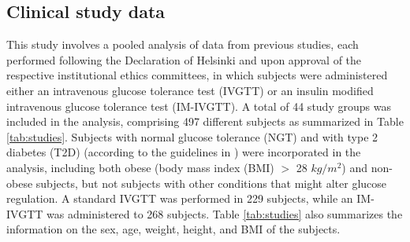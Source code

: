 \documentclass[utf8]{frontiersSCNS} %
\begin{document}
\subsection{Clinical study data}
This study involves a pooled analysis of data from previous studies, each performed following the Declaration of Helsinki and upon approval of the respective institutional ethics committees, in which subjects were administered either an intravenous glucose tolerance test (IVGTT) or an insulin modified intravenous glucose tolerance test (IM-IVGTT). A total of 44 study groups was included in the analysis, comprising 497 different subjects as summarized in Table \ref{tab:studies}. Subjects with normal glucose tolerance (NGT) and with type 2 diabetes (T2D) (according to the guidelines in \citet{t2dm_class}) were incorporated in the analysis, including both obese (body mass index (BMI) $>$ 28 $kg/m^2$) and non-obese subjects, but not subjects with other conditions that might alter glucose regulation. A standard IVGTT was performed in 229 subjects, while an IM-IVGTT was administered to 268 subjects. Table \ref{tab:studies} also summarizes the information on the sex, age, weight, height, and BMI of the subjects.
\end{document}
